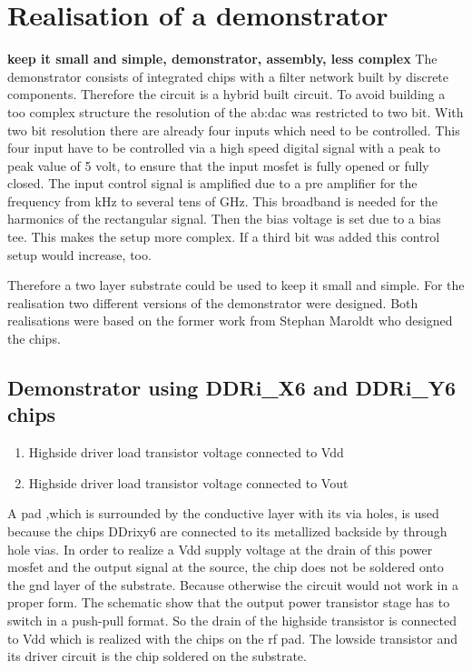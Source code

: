 \chapter{Realisation of a demonstrator}
\textbf{keep it small and simple, demonstrator, assembly, less complex} 
The demonstrator consists of integrated chips with a filter network built by discrete components.
Therefore the circuit is a hybrid built circuit.
To avoid building a too complex structure the resolution of the \gls{ab:dac} was restricted to two bit.
With two bit resolution there are already four inputs which need to be controlled.
This four input have to be controlled via a high speed digital signal with a peak to peak value of 5 volt, to ensure that the input mosfet is fully opened or fully closed.
The input control signal is amplified due to a pre amplifier for the frequency from kHz to several tens of GHz.
This broadband is needed for the harmonics of the rectangular signal.
Then the bias voltage is set due to a bias tee.
This makes the setup more complex. 
If a third bit was added this control setup would increase, too.

Therefore a two layer substrate could be used to keep it small and simple.
For the realisation two different versions of the demonstrator were designed. 
Both realisations were based on the former work from Stephan Maroldt who designed the chips. 
\section{Demonstrator using DDRi\_X6 and DDRi\_Y6 chips}
\begin{enumerate}
	\item Highside driver load transistor voltage connected to Vdd
	\item Highside driver load transistor voltage connected to Vout
\end{enumerate}
A pad ,which is surrounded by the conductive layer with its via holes, is used because the chips DDrixy6 are connected to its metallized backside by through hole vias. In order to realize a Vdd supply voltage at the drain of this power mosfet and the output signal at the source, the chip does not be soldered onto the gnd layer of the substrate. 
Because otherwise the circuit would not work in a proper form.
The schematic show that the output power transistor stage has to switch in a push-pull format. So the drain of the highside transistor is connected to Vdd which is realized with the chips on the rf pad. The lowside transistor and its driver circuit is the chip soldered on the substrate.
